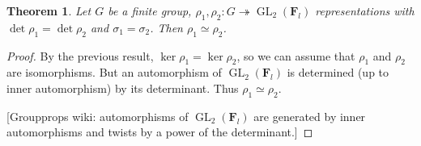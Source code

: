 \documentclass{article}
\DeclareMathOperator{\GL}{GL}
\newcommand{\bF}{\mathbf{F}}
\newtheorem{theorem}{Theorem}
\numberwithin{theorem}{section}
\begin{document}
\begin{theorem}
Let $G$ be a finite group, 
$\rho_1,\rho_2\colon G\twoheadrightarrow \GL_2(\bF_l)$ representations with 
$\det\rho_1 = \det\rho_2$ and $\sigma_1 = \sigma_2$. Then 
$\rho_1\simeq \rho_2$. 
\end{theorem}
\begin{proof}
By the previous result, $\ker\rho_1 = \ker\rho_2$, so we can assume that 
$\rho_1$ and $\rho_2$ are isomorphisms. But an automorphism of $\GL_2(\bF_l)$ 
is determined (up to inner automorphism) by its determinant. Thus 
$\rho_1\simeq \rho_2$. 


[Groupprops wiki: automorphisms of $\GL_2(\bF_l)$ are generated by 
inner automorphisms and twists by a power of the determinant.]
\end{proof}
\end{document}
